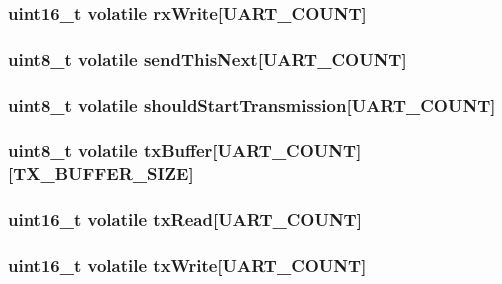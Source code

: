 \subsubsection[{rx\+Write}]{\setlength{\rightskip}{0pt plus 5cm}uint16\+\_\+t volatile rx\+Write\mbox{[}U\+A\+R\+T\+\_\+\+C\+O\+U\+N\+T\mbox{]}}\label{group__uart_ga1cdf2c2d0be76d213e71977232b2fbac}
\hypertarget{group__uart_gaa1a502a415b55c96a957f18c7c52be21}{}
\subsubsection[{send\+This\+Next}]{\setlength{\rightskip}{0pt plus 5cm}uint8\+\_\+t volatile send\+This\+Next\mbox{[}U\+A\+R\+T\+\_\+\+C\+O\+U\+N\+T\mbox{]}}\label{group__uart_gaa1a502a415b55c96a957f18c7c52be21}
\hypertarget{group__uart_ga156a853afd97bd4938e2f98d5960ffc2}{}
\subsubsection[{should\+Start\+Transmission}]{\setlength{\rightskip}{0pt plus 5cm}uint8\+\_\+t volatile should\+Start\+Transmission\mbox{[}U\+A\+R\+T\+\_\+\+C\+O\+U\+N\+T\mbox{]}}\label{group__uart_ga156a853afd97bd4938e2f98d5960ffc2}
\hypertarget{group__uart_ga7f4d2b5ef19fd7e6d9a75757f290c68f}{}
\subsubsection[{tx\+Buffer}]{\setlength{\rightskip}{0pt plus 5cm}uint8\+\_\+t volatile tx\+Buffer\mbox{[}U\+A\+R\+T\+\_\+\+C\+O\+U\+N\+T\mbox{]}\mbox{[}{\bf T\+X\+\_\+\+B\+U\+F\+F\+E\+R\+\_\+\+S\+I\+Z\+E}\mbox{]}}\label{group__uart_ga7f4d2b5ef19fd7e6d9a75757f290c68f}
\hypertarget{group__uart_ga9da1183eed5d114e277463b1313454d6}{}
\subsubsection[{tx\+Read}]{\setlength{\rightskip}{0pt plus 5cm}uint16\+\_\+t volatile tx\+Read\mbox{[}U\+A\+R\+T\+\_\+\+C\+O\+U\+N\+T\mbox{]}}\label{group__uart_ga9da1183eed5d114e277463b1313454d6}
\hypertarget{group__uart_ga51f11860503e517cd61cfcd7a4c960eb}{}
\subsubsection[{tx\+Write}]{\setlength{\rightskip}{0pt plus 5cm}uint16\+\_\+t volatile tx\+Write\mbox{[}U\+A\+R\+T\+\_\+\+C\+O\+U\+N\+T\mbox{]}}\label{group__uart_ga51f11860503e517cd61cfcd7a4c960eb}
